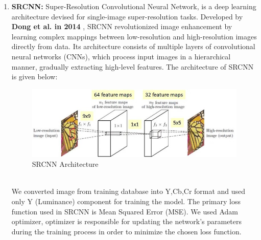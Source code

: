 \begin{enumerate}
    \item {\bf SRCNN:} Super-Resolution Convolutional Neural Network, is a deep learning architecture devised for single-image super-resolution tasks. Developed by {\bf Dong et al. in 2014} \cite{r2}, SRCNN revolutionized image enhancement by learning complex mappings between low-resolution and high-resolution images directly from data. Its architecture consists of multiple layers of convolutional neural networks (CNNs), which process input images in a hierarchical manner, gradually extracting high-level features. The architecture of SRCNN is given below:
    \begin{figure}[ht]
        \centering
        \includegraphics[width=5in]{./figures/srcnn.jpg}
        \caption{SRCNN Architecture}
    \end{figure} \\
    We converted image from training database into Y,Cb,Cr format and used only Y (Luminance) component for training the model. The primary loss function used in SRCNN is Mean Squared Error (MSE). We used Adam optimizer, optimizer is responsible for updating the network's parameters during the training process in order to minimize the chosen loss function.


\end{enumerate}
